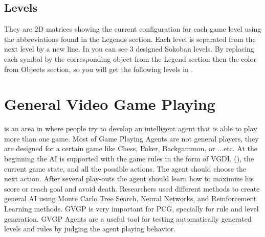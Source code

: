 \subsection{Levels}
They are 2D matrices showing the current configuration for each game level using the abbreviations found in the Legends section. Each level is separated from the next level by a new line. In  you can see 3 designed Sokoban levels. By replacing each symbol by the corresponding object from the Legend section then the color from Objects section, so you will get the following levels in . 
\newpage
{}

\section{General Video Game Playing}
 is an area in  where people try to develop an intelligent agent that is able to play more than one game. Most of Game Playing Agents are not general players, they are designed for a certain game like Chess, Poker, Backgammon, or ...etc. At the beginning the AI is supported with the game rules in the form of VGDL (), the current game state, and all the possible actions. The agent should choose the next action. After several play-outs the agent should learn how to maximize his score or reach goal and avoid death. Researchers used different methods to create general AI using Monte Carlo Tree Search, Neural Networks, and Reinforcement Learning methods. GVGP is very important for PCG, specially for rule and level generation. GVGP Agents are a useful tool for testing automatically generated levels and rules by judging the agent playing behavior.\cite{gvgp}